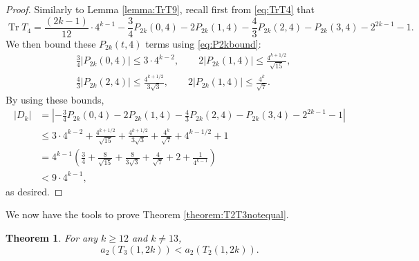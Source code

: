 \documentclass[11pt,letterpaper,reqno]{amsart}
\numberwithin{figure}{section}
\numberwithin{table}{section}
\theoremstyle{definition}
\theoremstyle{plain}
\newcommand{\lrp}[1]{\left(#1\right)}
\newtheorem{theorem}{Theorem}[section]
\theoremstyle{definition}
\theoremstyle{definition}
\theoremstyle{remark}
\numberwithin{equation}{section}
\DeclareMathOperator{\Tr}{Tr}
\begin{document}
\begin{proof}
    Similarly to Lemma \ref{lemma:TrT9}, recall first from \eqref{eq:TrT4} that
    \begin{equation}
        \Tr T_4 = \frac{(2k-1)}{12}\cdot 4^{k-1} -\frac{3}{4}P_{2k}(0, 4) -2P_{2k}(1, 4) - \frac{4}{3}P_{2k}(2, 4) - P_{2k}(3, 4) - 2^{2k-1} - 1.
    \end{equation}
    We then bound these $P_{2k}(t, 4)$ terms using \eqref{eq:P2kbound}:
    \begin{align}
        &\frac{3}{4}|P_{2k}(0, 4)|\leq 3\cdot 4^{k-2}, \qquad2|P_{2k}(1,4)|\leq \frac{4^{k+1/2}}{\sqrt{15}},\\
        &\frac{4}{3}|P_{2k}(2, 4)|\leq \frac{4^{k+1/2}}{3\sqrt{3}}, \qquad 2|P_{2k}(1,4)|\leq \frac{4^{k}}{\sqrt{7}}.
    \end{align}
    By using these bounds,
    \begin{align}
        |D_k|&=\left|-\frac{3}{4}P_{2k}(0, 4) -2P_{2k}(1, 4) - \frac{4}{3}P_{2k}(2, 4) - P_{2k}(3, 4)- 2^{2k-1} - 1\right|\\
        &\leq 3\cdot 4^{k-2}+\frac{4^{k+1/2}}{\sqrt{15}}+\frac{4^{k+1/2}}{3\sqrt{3}}+\frac{4^{k}}{\sqrt{7}}+4^{k-1/2}+1\\
        &= 4^{k-1} \lrp{ \frac34 +\frac{8}{\sqrt{15}}+\frac{8}{3\sqrt{3}}+\frac{4}{\sqrt{7}}+2+\frac{1}{4^{k-1}} }\\
        &< 9\cdot 4^{k-1},
    \end{align}
    as desired.
\end{proof}


We now have the tools to prove Theorem \ref{theorem:T2T3notequal}.


{
\renewcommand{\thetheorem}{\ref{theorem:T2T3notequal}}
\begin{theorem}
    For any $k\geq 12$ and $k\neq 13$,
    \begin{equation}
        a_2(T_3(1,2k))< a_2(T_2(1,2k)).
    \end{equation}
\end{theorem}
\addtocounter{theorem}{-1}
}
\end{document}
